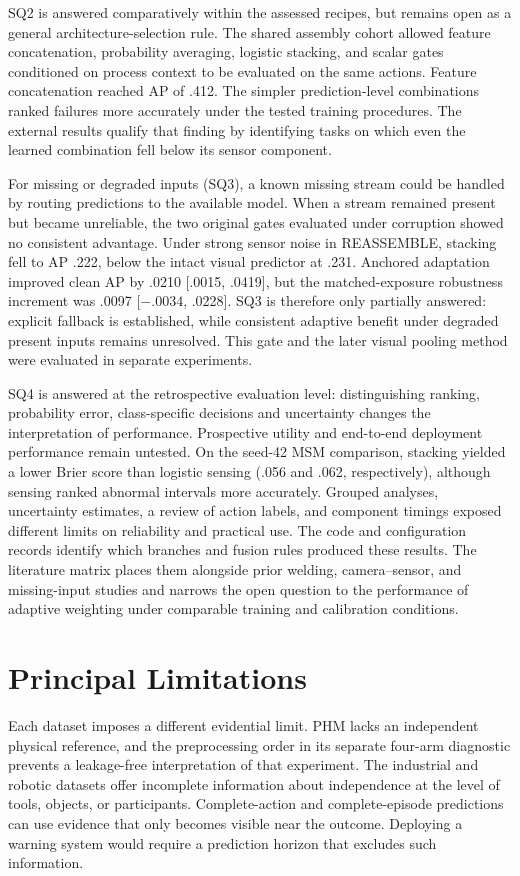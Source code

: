 SQ2 is answered comparatively within the assessed recipes, but remains open as a general architecture-selection rule. The shared assembly cohort allowed feature concatenation, probability averaging, logistic stacking, and scalar gates conditioned on process context to be evaluated on the same actions. Feature concatenation reached AP of .412. The simpler prediction-level combinations ranked failures more accurately under the tested training procedures. The external results qualify that finding by identifying tasks on which even the learned combination fell below its sensor component.

For missing or degraded inputs (SQ3), a known missing stream could be handled by routing predictions to the available model. When a stream remained present but became unreliable, the two original gates evaluated under corruption showed no consistent advantage. Under strong sensor noise in REASSEMBLE, stacking fell to AP .222, below the intact visual predictor at .231. Anchored adaptation improved clean AP by .0210 [.0015, .0419], but the matched-exposure robustness increment was .0097 [$-.0034$, .0228]. SQ3 is therefore only partially answered: explicit fallback is established, while consistent adaptive benefit under degraded present inputs remains unresolved. This gate and the later visual pooling method were evaluated in separate experiments.

SQ4 is answered at the retrospective evaluation level: distinguishing ranking, probability error, class-specific decisions and uncertainty changes the interpretation of performance. Prospective utility and end-to-end deployment performance remain untested. On the seed-42 MSM comparison, stacking yielded a lower Brier score than logistic sensing (.056 and .062, respectively), although sensing ranked abnormal intervals more accurately. Grouped analyses, uncertainty estimates, a review of action labels, and component timings exposed different limits on reliability and practical use. The code and configuration records identify which branches and fusion rules produced these results. The literature matrix places them alongside prior welding, camera--sensor, and missing-input studies and narrows the open question to the performance of adaptive weighting under comparable training and calibration conditions.

\section{Principal Limitations}
Each dataset imposes a different evidential limit. PHM lacks an independent physical reference, and the preprocessing order in its separate four-arm diagnostic prevents a leakage-free interpretation of that experiment. The industrial and robotic datasets offer incomplete information about independence at the level of tools, objects, or participants. Complete-action and complete-episode predictions can use evidence that only becomes visible near the outcome. Deploying a warning system would require a prediction horizon that excludes such information.

